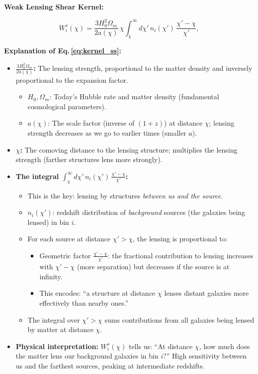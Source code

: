 \noindent\textbf{\large Weak Lensing Shear Kernel:}

\begin{equation}
    W^s_i(\chi) = \frac{3H_0^2\Omega_m}{2a(\chi)}\,\chi
    \int_{\chi}^\infty d\chi'\,n_i(\chi')\,\frac{\chi'-\chi}{\chi'},
    \label{eq:kernel_ss}
\end{equation}

\noindent\textbf{\large Explanation of Eq.\,\eqref{eq:kernel_ss}:}\\

\begin{itemize}[leftmargin=1.5cm]
    \item \textbf{$\frac{3H_0^2\Omega_m}{2a(\chi)}$:} The lensing strength, proportional to the matter density and inversely proportional to the expansion factor.
    \begin{itemize}
        \item $H_0, \Omega_m$: Today's Hubble rate and matter density (fundamental cosmological parameters).
        \item $a(\chi)$: The scale factor (inverse of $(1+z)$) at distance $\chi$; lensing strength decreases as we go to earlier times (smaller $a$).
    \end{itemize}

    \item \textbf{$\chi$:} The comoving distance to the lensing structure; multiplies the lensing strength (farther structures lens more strongly).

    \item \textbf{The integral $\int_{\chi}^\infty d\chi'\, n_i(\chi')\, \frac{\chi'-\chi}{\chi'}$:}
    \begin{itemize}
        \item This is the key: lensing by structures \emph{between us and the source}.
        \item $n_i(\chi')$: redshift distribution of \emph{background} sources (the galaxies being lensed) in bin $i$.
        \item For each source at distance $\chi' > \chi$, the lensing is proportional to:
        \begin{itemize}
            \item Geometric factor $\frac{\chi'-\chi}{\chi'}$: the fractional contribution to lensing increases with $\chi' - \chi$ (more separation) but decreases if the source is at infinity.
            \item This encodes: ``a structure at distance $\chi$ lenses distant galaxies more effectively than nearby ones.''
        \end{itemize}
        \item The integral over $\chi' > \chi$ sums contributions from all galaxies being lensed by matter at distance $\chi$.
    \end{itemize}

    \item \textbf{Physical interpretation:} $W^s_i(\chi)$ tells us: ``At distance $\chi$, how much does the matter lens our background galaxies in bin $i$?'' High sensitivity between us and the farthest sources, peaking at intermediate redshifts.
\end{itemize}


